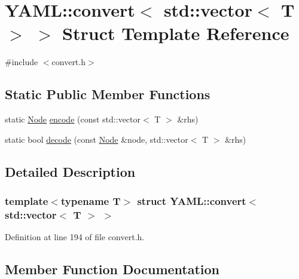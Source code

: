 \hypertarget{struct_y_a_m_l_1_1convert_3_01std_1_1vector_3_01_t_01_4_01_4}{}\section{Y\+A\+ML\+::convert$<$ std\+::vector$<$ T $>$ $>$ Struct Template Reference}
\label{struct_y_a_m_l_1_1convert_3_01std_1_1vector_3_01_t_01_4_01_4}


{\ttfamily \#include $<$convert.\+h$>$}

\subsection*{Static Public Member Functions}
\begin{DoxyCompactItemize}
\item 
static \mbox{\hyperlink{class_y_a_m_l_1_1_node}{Node}} \mbox{\hyperlink{struct_y_a_m_l_1_1convert_3_01std_1_1vector_3_01_t_01_4_01_4_ac4d16f5ef721ee76356b537dbffe0737}{encode}} (const std\+::vector$<$ T $>$ \&rhs)
\item 
static bool \mbox{\hyperlink{struct_y_a_m_l_1_1convert_3_01std_1_1vector_3_01_t_01_4_01_4_a9e929c262d8fe1df77910d091f978bd0}{decode}} (const \mbox{\hyperlink{class_y_a_m_l_1_1_node}{Node}} \&node, std\+::vector$<$ T $>$ \&rhs)
\end{DoxyCompactItemize}


\subsection{Detailed Description}
\subsubsection*{template$<$typename T$>$\newline
struct Y\+A\+M\+L\+::convert$<$ std\+::vector$<$ T $>$ $>$}



Definition at line 194 of file convert.\+h.



\subsection{Member Function Documentation}
\mbox{\label{struct_y_a_m_l_1_1convert_3_01std_1_1vector_3_01_t_01_4_01_4_a9e929c262d8fe1df77910d091f978bd0}} 
